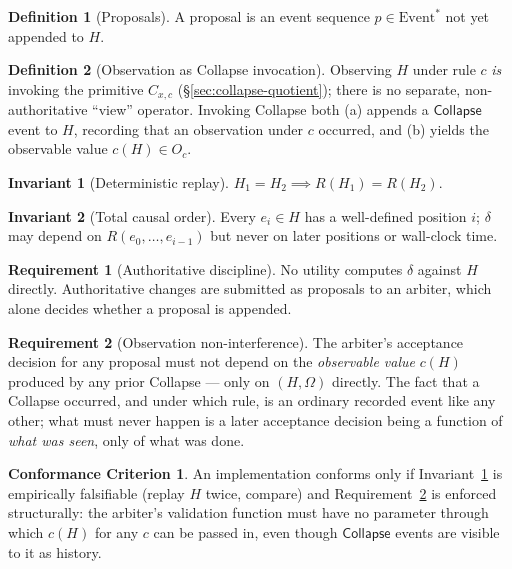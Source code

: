 \documentclass[12pt]{article}
\theoremstyle{definition}
\newtheorem{definition}{Definition}
\newtheorem{invariant}{Invariant}
\newtheorem{requirement}{Requirement}
\newtheorem{conformance}{Conformance Criterion}
\newcommand{\Hist}{H}
\newcommand{\Replay}{R}
\newcommand{\EventStar}{\mathrm{Event}^{*}}
\newcommand{\CollapseOp}{\mathsf{Collapse}}
\begin{document}
\begin{definition}[Proposals]
A proposal is an event sequence $p \in \EventStar$ not yet appended to $\Hist$.
\end{definition}

\begin{definition}[Observation as Collapse invocation]
Observing $\Hist$ under rule $c$ \emph{is} invoking the primitive $C_{x,c}$ (\S\ref{sec:collapse-quotient}); there is no separate, non-authoritative ``view'' operator. Invoking Collapse both (a) appends a $\CollapseOp$ event to $\Hist$, recording that an observation under $c$ occurred, and (b) yields the observable value $c(\Hist) \in O_c$.
\end{definition}

\begin{invariant}[Deterministic replay]
\label{inv:replay}
$\Hist_1 = \Hist_2 \implies \Replay(\Hist_1) = \Replay(\Hist_2)$.
\end{invariant}

\begin{invariant}[Total causal order]
Every $e_i \in \Hist$ has a well-defined position $i$; $\delta$ may depend on $\Replay(e_0,\dots,e_{i-1})$ but never on later positions or wall-clock time.
\end{invariant}

\begin{requirement}[Authoritative discipline]
No utility computes $\delta$ against $\Hist$ directly. Authoritative changes are submitted as proposals to an arbiter, which alone decides whether a proposal is appended.
\end{requirement}

\begin{requirement}[Observation non-interference]
\label{req:view}
The arbiter's acceptance decision for any proposal must not depend on the \emph{observable value} $c(\Hist)$ produced by any prior Collapse — only on $(\Hist,\Omega)$ directly. The fact that a Collapse occurred, and under which rule, is an ordinary recorded event like any other; what must never happen is a later acceptance decision being a function of \emph{what was seen}, only of what was done.
\end{requirement}

\begin{conformance}
An implementation conforms only if Invariant~\ref{inv:replay} is empirically falsifiable (replay $\Hist$ twice, compare) and Requirement~\ref{req:view} is enforced structurally: the arbiter's validation function must have no parameter through which $c(\Hist)$ for any $c$ can be passed in, even though $\CollapseOp$ events are visible to it as history.
\end{conformance}
\end{document}

